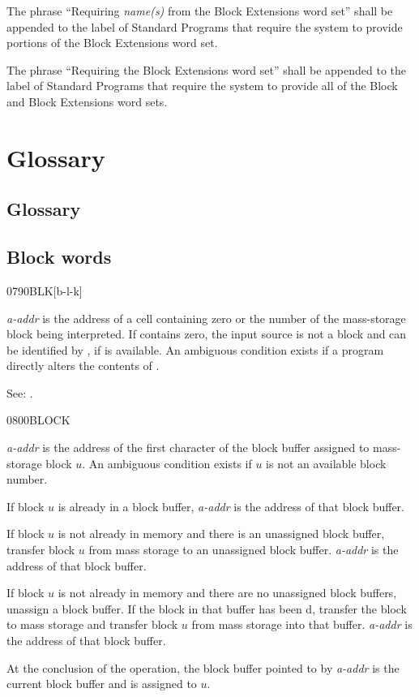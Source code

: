 The phrase ``Requiring \emph{name(s)} from the Block Extensions
word set'' shall be appended to the label of Standard Programs
that require the system to provide portions of the Block Extensions
word set.

The phrase ``Requiring the Block Extensions word set'' shall be
appended to the label of Standard Programs that require the system
to provide all of the Block and Block Extensions word sets.


\section{Glossary} %

\begin{info}
\subsection{Glossary}
\end{info}

\subsection{Block words} %

\begin{newword}{0790}{BLK}[b-l-k]

	\emph{a-addr} is the address of a cell containing zero or the
	number of the mass-storage block being interpreted. If
	 contains zero, the input source is not a block and
	can be identified by , if
	 is available. An ambiguous condition
	exists if a program directly alters the contents of .

\item[See:]
	.
\end{newword}


\begin{newword}{0800}{BLOCK}

	\emph{a-addr} is the address of the first character of the
	block buffer assigned to mass-storage block $u$. An ambiguous
	condition exists if $u$ is not an available block number.

	If block $u$ is already in a block buffer, \emph{a-addr} is
	the address of that block buffer.

	If block $u$ is not already in memory and there is an
	unassigned block buffer, transfer block $u$ from mass storage
	to an unassigned block buffer. \emph{a-addr} is the address
	of that block buffer.

	If block $u$ is not already in memory and there are no
	unassigned block buffers, unassign a block buffer. If the block
	in that buffer has been d, transfer the block to
	mass storage and transfer block $u$ from mass storage into that
	buffer. \emph{a-addr} is the address of that block buffer.

	At the conclusion of the operation, the block buffer pointed to
	by \emph{a-addr} is the current block buffer and is assigned to
	$u$.
\end{newword}


